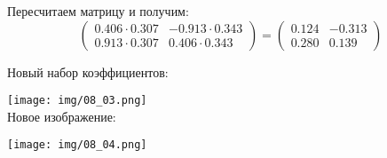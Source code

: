 Пересчитаем матрицу и получим:
$$
\begin{pmatrix}
0.406 \cdot 0.307& -0.913 \cdot 0.343\\
0.913 \cdot 0.307& 0.406 \cdot 0.343
\end{pmatrix}
=
\begin{pmatrix}
0.124& -0.313\\
0.280& 0.139
\end{pmatrix}
$$

Новый набор коэффициентов:

\texttt{[image: img/08\_03.png]}\\

Новое изображение:

\texttt{[image: img/08\_04.png]}\\


\pagebreak
